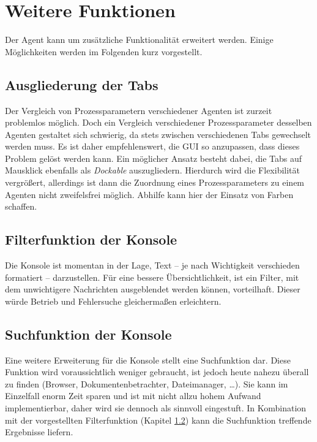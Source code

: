 \documentclass[a4paper,12pt,oneside,openright,onecolumn,final,titlepage,fleqn,ngerman]{scrreprt}
\begin{document}
	\section{Weitere Funktionen}
	Der Agent kann um zusätzliche Funktionalität erweitert werden. Einige Mög\-lich\-keit\-en werden im Folgenden kurz vorgestellt.
	
	\subsection{Ausgliederung der Tabs}
	Der Vergleich von Prozessparametern verschiedener Agenten ist zurzeit problemlos mög\-lich. Doch ein Vergleich verschiedener Prozessparameter desselben Agenten gestaltet sich schwierig, da stets zwischen verschiedenen Tabs gewechselt werden muss. Es ist daher empfehlenswert, die GUI so anzupassen, dass dieses Problem gelöst werden kann. Ein möglicher Ansatz besteht dabei, die Tabs auf Mausklick ebenfalls als \emph{Dockable} auszugliedern. Hierdurch wird die Flexibilität vergrößert, allerdings ist dann die Zuordnung eines Prozessparameters zu einem Agenten nicht zweifelsfrei möglich. Abhilfe kann hier der Einsatz von Farben schaffen.
	
	\subsection{Filterfunktion der Konsole}\label{kap_KonsoleFilter}
	Die Konsole ist momentan in der Lage, Text -- je nach Wichtigkeit verschieden formatiert -- darzustellen. Für eine bessere Übersichtlichkeit, ist ein Filter, mit dem unwichtigere Nachrichten ausgeblendet werden können, vorteilhaft. Dieser würde Betrieb und Fehlersuche gleichermaßen erleichtern.
	
	\subsection{Suchfunktion der Konsole}
	Eine weitere Erweiterung für die Konsole stellt eine Suchfunktion dar. Diese Funktion wird voraussichtlich weniger gebraucht, ist jedoch heute nahezu überall zu finden (Browser, Dokumentenbetrachter, Dateimanager, \ldots{}). Sie kann im Einzelfall enorm Zeit sparen und ist mit nicht allzu hohem Aufwand implementierbar, daher wird sie dennoch als sinnvoll eingestuft. In Kombination mit der vorgestellten Filterfunktion (Kapitel \ref{kap_KonsoleFilter}) kann die Suchfunktion treffende Ergebnisse liefern.
	
\end{document}
